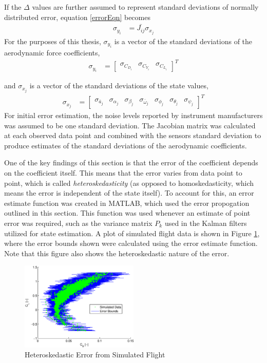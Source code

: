 If the $\Delta$ values are further assumed to represent standard deviations of normally distributed error, equation \ref{errorEqn} becomes
\begin{align}
\sigma_{y_i} &= \bar{J_{ij}} \sigma_{x_j}
\end{align}
For the purposes of this thesis, $\sigma_{y_i}$ is a vector of the standard deviations of the aerodynamic force coefficients,
\begin{align}
\sigma_{y_i} &= \begin{bmatrix} \sigma_{C_{D_i}} & \sigma_{C_{Y_i}} & \sigma_{C_{L_i}} \end{bmatrix}^T
\end{align}

and $\sigma_{x_j}$ is a vector of the standard deviations of the state values,
\begin{align}
\sigma_{x_j} &= \begin{bmatrix} \sigma_{\bar{a}_j} & \sigma_{\alpha_j} & \sigma_{\beta_j} & \sigma_{\bar{\omega}_j} & \sigma_{\phi_j} & \sigma_{\theta_j} & \sigma_{\psi_j}\end{bmatrix}^T
\end{align}
For initial error estimation, the noise levels reported by instrument manufacturers was assumed to be one standard deviation. The Jacobian matrix was calculated at each observed data point and combined with the sensors standard deviation to produce estimates of the standard deviations of the aerodynamic coefficients.

One of the key findings of this section is that the error of the coefficient depends on the coefficient itself. This means that the error varies from data point to point, which is called \textit{heteroskedasticity} (as opposed to homoskedasticity, which means the error is independent of the state itself). To account for this, an error estimate function was created in MATLAB, which used the error propogation outlined in this section. This function was used whenever an estimate of point error was required, such as the variance matrix $P_k$ used in the Kalman filters utilized for state estimation. A plot of simulated flight data is shown in Figure \ref{errorBndFigure}, where the error bounds shown were calculated using the error estimate function. Note that this figure also shows the heteroskedastic nature of the error.

\begin{figure}[h!]
  \caption{Heteroskedastic Error from Simulated Flight} \label{errorBndFigure}
  \centering
    \includegraphics[width=0.5\textwidth]{figures/heteroskedasticity.eps}
\end{figure}

